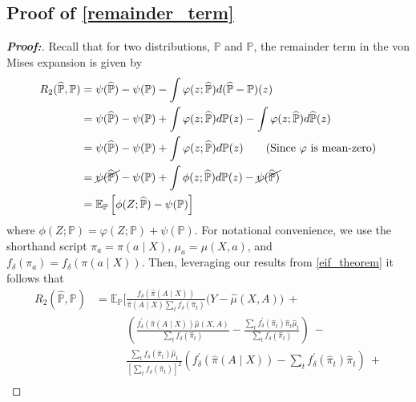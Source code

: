 \documentclass[11pt,twoside]{article}
\theoremstyle{definition}
\theoremstyle{remark}
\begin{document}
\subsection{Proof of \texorpdfstring{\cref{remainder_term}}{Proposition 3}} \label{remainder_term_proof}
\begin{proof}[\textbf{Proof:}]
Recall that for two distributions, $\mathbb{P}$ and $\widehat{\mathbb{P}}$, the remainder term in the von Mises expansion is given by
\begin{align*}
    R_2(\widehat{\mathbb{P}}, \mathbb{P}) &= \psi(\widehat{\mathbb{P}}) - \psi(\mathbb{P}) - \int \varphi (z; \widehat{\mathbb{P}}) d(\widehat{\mathbb{P}} - \mathbb{P})(z) \\
    &= \psi(\widehat{\mathbb{P}}) - \psi(\mathbb{P}) + \int \varphi (z; \widehat{\mathbb{P}}) d\mathbb{P}(z) - \int \varphi (z; \widehat{\mathbb{P}}) d\widehat{\mathbb{P}}(z) \\
    &= \psi(\widehat{\mathbb{P}}) - \psi(\mathbb{P}) + \int \varphi (z; \widehat{\mathbb{P}}) d\mathbb{P}(z) \tag{Since $\varphi$ is mean-zero}\\
    &= \cancel{\psi(\widehat{\mathbb{P}})} - \psi(\mathbb{P}) + \int\phi(z; \widehat{\mathbb{P}}) d\mathbb{P}(z) - \cancel{\psi(\widehat{\mathbb{P}})} \\
    &= \mathbb{E}_\mathbb{P}\left[\phi(Z; \widehat{\mathbb{P}}) - \psi(\mathbb{P})\right]
\end{align*}
where $\phi(Z; \mathbb{P}) = \varphi(Z; \mathbb{P}) + \psi(\mathbb{P})$. For notational convenience, we use the shorthand script $\pi_a = \pi(a \mid X)$, $\mu_a = \mu(X, a)$, and $f_\delta(\pi_a) = f_\delta( \pi(a \mid X))$. Then, leveraging our results from \cref{eif_theorem} it follows that
\begin{align*}
    R_2(\widehat{\mathbb{P}}, \mathbb{P}) &= \mathbb{E}_\mathbb{P}\Bigg[ \frac{f_\delta(\widehat{\pi}(A \mid X))}{\widehat{\pi}(A \mid X) \sum_t f_\delta(\widehat{\pi}_t)}\Big(Y - \widehat{\mu}(X, A) \Big) \: + \tag{$i$}\\
    &\phantom{{}={\mathbb{E}_\mathbb{P}\Bigg[}} \left( \frac{f^{\prime}_\delta(\widehat{\pi}(A \mid X)) \widehat{\mu}(X, A)}{\sum_t f_\delta(\widehat{\pi}_t)} - \frac{\sum_t f^{\prime}_\delta(\widehat{\pi}_t) \widehat{\pi}_t \widehat{\mu}_t}{\sum_t f_\delta(\widehat{\pi}_t)} \right) \: - \tag{$ii$} \\
    &\phantom{{}={\mathbb{E}_\mathbb{P}\Bigg[}}  \frac{\sum_t f_\delta( \widehat{\pi}_t) \widehat{\mu}_t}{\left[\sum_t f_\delta(\widehat{\pi}_t) \right]^2} \left(f^\prime_\delta( \widehat{\pi}(A \mid X)) - \sum_t f^\prime_\delta( \widehat{\pi}_t) \widehat{\pi}_t \right) \: + \tag{$iii$}\\

\end{align*}
\end{proof}
\end{document}
